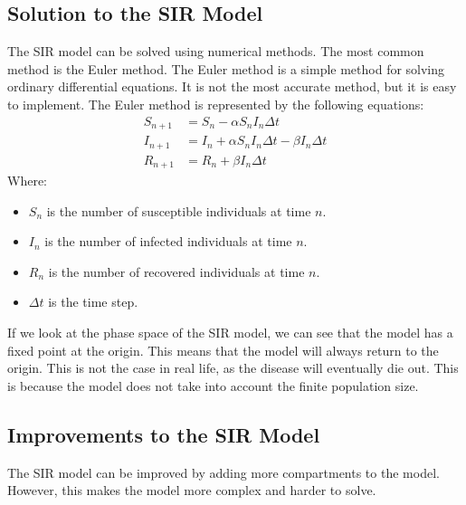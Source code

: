 \documentclass{report}
\begin{document}
\subsection{Solution to the SIR Model}
The SIR model can be solved using numerical methods. The most common method is the Euler method. The Euler method is a simple method for solving ordinary differential equations. It is not the most accurate method, but it is easy to implement. The Euler method is represented by the following equations:
\begin{align}
S_{n+1} &= S_n - \alpha S_n I_n \Delta t \label{sir_euler_S} \\
I_{n+1} &= I_n + \alpha S_n I_n \Delta t - \beta I_n \Delta t \label{sir_euler_I} \\
R_{n+1} &= R_n + \beta I_n \Delta t \label{sir_euler_R}
\end{align}
Where:
\begin{itemize}
    \item $S_n$ is the number of susceptible individuals at time $n$.
    \item $I_n$ is the number of infected individuals at time $n$.
    \item $R_n$ is the number of recovered individuals at time $n$.
    \item $\Delta t$ is the time step.
\end{itemize}
If we look at the phase space of the SIR model, we can see that the model has a fixed point at the origin. This means that the model will always return to the origin. This is not the case in real life, as the disease will eventually die out. This is because the model does not take into account the finite population size.\\

\subsection{Improvements to the SIR Model}
The SIR model can be improved by adding more compartments to the model. However, this makes the model more complex and harder to solve.
\end{document}
